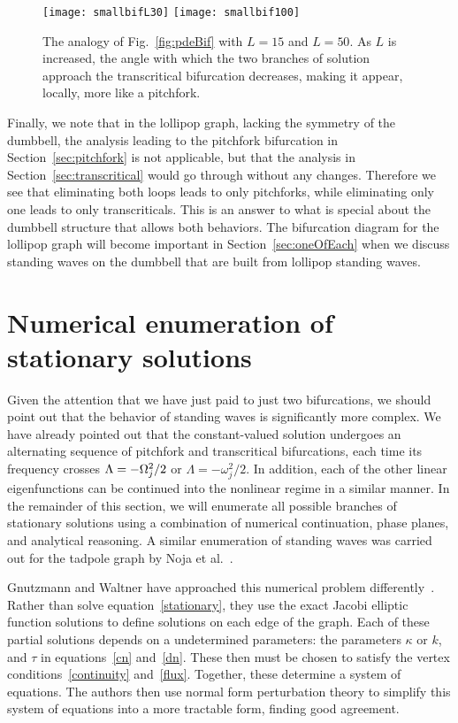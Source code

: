 \documentclass{article}
\numberwithin{equation}{section}
\numberwithin{figure}{section}
\begin{document}
\begin{figure}[htbp] %
   \centering
   \texttt{[image: smallbifL30]} 
   \texttt{[image: smallbif100]} 
   \caption{The analogy of Fig.~\ref{fig:pdeBif} with $L=15$ and $L=50$. As $L$ is increased, the angle with which the two branches of solution approach the transcritical bifurcation decreases, making it appear, locally, more like a pitchfork.}
\label{fig:bigL}
\end{figure}

Finally, we note that in the lollipop graph, lacking the symmetry of the dumbbell, the analysis leading to the pitchfork bifurcation in Section~\ref{sec:pitchfork} is not applicable, but that the analysis in Section~\ref{sec:transcritical} would go through without any changes. Therefore we see that eliminating both loops leads to only pitchforks, while eliminating only one leads to only transcriticals. This is an answer to what is special about the dumbbell structure that allows both behaviors. The bifurcation diagram for the lollipop graph will become important in Section~\ref{sec:oneOfEach} when we discuss standing waves on the dumbbell that are built from lollipop standing waves.

\section{Numerical enumeration of stationary solutions}
\label{sec:more}

Given the attention that we have just paid to just two bifurcations, we should point out that the behavior of standing waves is significantly more complex. We have already pointed out that the constant-valued solution undergoes an alternating sequence of pitchfork and transcritical bifurcations, each time its frequency crosses $\Lambda = -\Omega_j^2/2$ or $\Lambda = -\omega_j^2/2$. In addition, each of the other linear eigenfunctions can be continued into the nonlinear regime in a similar manner. In the remainder of this section, we will enumerate all possible branches of stationary solutions using a combination of numerical continuation, phase planes, and analytical reasoning. A similar enumeration of standing waves was carried out for the tadpole graph by Noja et al.~\cite{Noja:2015hx}. 

Gnutzmann and Waltner have approached this numerical problem differently~\cite{Gnutzmann:2016hma,Gnutzmann:2016ec}. Rather than solve equation~\eqref{stationary}, they use the exact Jacobi elliptic function solutions to define solutions on each edge of the graph. Each of these partial solutions depends on a undetermined parameters: the parameters $\kappa$ or $k$, and $\tau$ in equations~\eqref{cn} and~\eqref{dn}. These then must be chosen to satisfy the vertex conditions~\eqref{continuity} and~\eqref{flux}. Together, these determine a system of equations. The authors then use normal form perturbation theory to simplify this system of equations into a more tractable form, finding good agreement.
\end{document}
